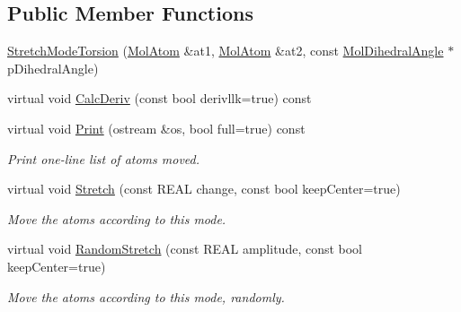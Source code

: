 \subsection*{Public Member Functions}
\begin{DoxyCompactItemize}
\item 
\mbox{\hyperlink{struct_obj_cryst_1_1_stretch_mode_torsion_a87d8b940172d8aaa8961d70edc891424}{Stretch\+Mode\+Torsion}} (\mbox{\hyperlink{class_obj_cryst_1_1_mol_atom}{Mol\+Atom}} \&at1, \mbox{\hyperlink{class_obj_cryst_1_1_mol_atom}{Mol\+Atom}} \&at2, const \mbox{\hyperlink{class_obj_cryst_1_1_mol_dihedral_angle}{Mol\+Dihedral\+Angle}} $\ast$p\+Dihedral\+Angle)
\item 
virtual void \mbox{\hyperlink{struct_obj_cryst_1_1_stretch_mode_torsion_af8e6659a98b089589e7485ff13e9eb66}{Calc\+Deriv}} (const bool derivllk=true) const
\item 
\mbox{\label{struct_obj_cryst_1_1_stretch_mode_torsion_a89776807b20a3c8b7b62d7a0f30bd0ac}} 
virtual void \mbox{\hyperlink{struct_obj_cryst_1_1_stretch_mode_torsion_a89776807b20a3c8b7b62d7a0f30bd0ac}{Print}} (ostream \&os, bool full=true) const
\begin{DoxyCompactList}\small\item\em Print one-\/line list of atoms moved. \end{DoxyCompactList}\item 
\mbox{\label{struct_obj_cryst_1_1_stretch_mode_torsion_af53e4fdb12e0dac8e4cb7b7a3ee3d86c}} 
virtual void \mbox{\hyperlink{struct_obj_cryst_1_1_stretch_mode_torsion_af53e4fdb12e0dac8e4cb7b7a3ee3d86c}{Stretch}} (const R\+E\+AL change, const bool keep\+Center=true)
\begin{DoxyCompactList}\small\item\em Move the atoms according to this mode. \end{DoxyCompactList}\item 
\mbox{\label{struct_obj_cryst_1_1_stretch_mode_torsion_a9b8139f80374cd1b0fe8fa1a3621b5f2}} 
virtual void \mbox{\hyperlink{struct_obj_cryst_1_1_stretch_mode_torsion_a9b8139f80374cd1b0fe8fa1a3621b5f2}{Random\+Stretch}} (const R\+E\+AL amplitude, const bool keep\+Center=true)
\begin{DoxyCompactList}\small\item\em Move the atoms according to this mode, randomly. \end{DoxyCompactList}\end{DoxyCompactItemize}
